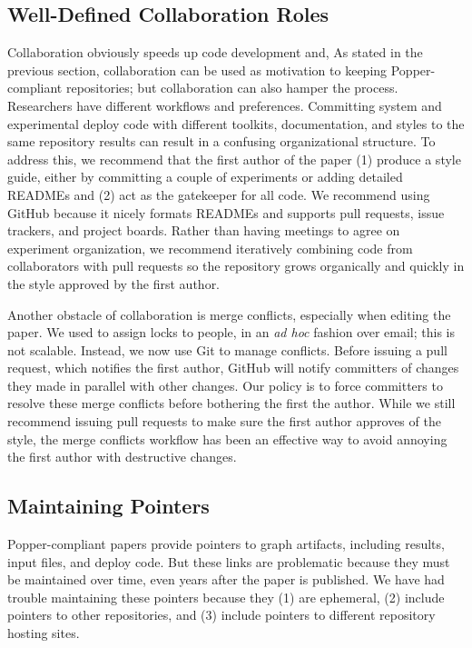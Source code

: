 \subsection{Well-Defined Collaboration Roles}

Collaboration obviously speeds up code development and, As stated in the
previous section, collaboration can be used as motivation to keeping
Popper-compliant repositories; but collaboration can also hamper the process.
Researchers have different workflows and preferences. Committing system and
experimental deploy code with different toolkits, documentation, and styles to
the same repository results can result in a confusing organizational structure.
To address this, we recommend that the first author of the paper (1) produce a
style guide, either by committing a couple of experiments or adding detailed
READMEs and (2) act as the gatekeeper for all code. We recommend using GitHub
because it nicely formats READMEs and supports pull requests, issue trackers,
and project boards. Rather than having meetings to agree on experiment
organization, we recommend iteratively combining code from collaborators with
pull requests so the repository grows organically and quickly in the style
approved by the first author.

Another obstacle of collaboration is merge conflicts, especially when editing
the paper. We used to assign locks to people, in an {\it ad hoc} fashion over
email; this is not scalable. Instead, we now use Git to manage conflicts.
Before issuing a pull request, which notifies the first author, GitHub will
notify committers of changes they made in parallel with other changes. Our
policy is to force committers to resolve these merge conflicts before bothering
the first the author. While we still recommend issuing pull requests to make
sure the first author approves of the style, the merge conflicts workflow has
been an effective way to avoid annoying the first author with destructive
changes.

\subsection{Maintaining Pointers}

Popper-compliant papers provide pointers to graph artifacts, including results,
input files, and deploy code. But these links are problematic because they must
be maintained over time, even years after the paper is published. We have had
trouble maintaining these pointers because they (1) are ephemeral, (2) include
pointers to other repositories, and (3) include pointers to different
repository hosting sites.

